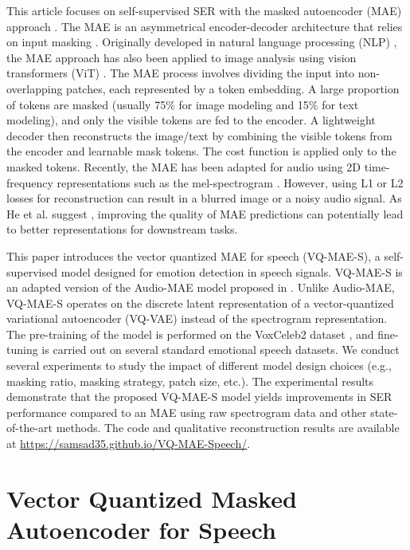 \documentclass{article}
\begin{document}
This article focuses on self-supervised SER with the masked autoencoder (MAE) approach \cite{he2022masked}. The MAE is an asymmetrical encoder-decoder architecture that relies on input masking \cite{he2022masked}. Originally developed in natural language processing (NLP) \cite{devlin2018bert}, the MAE approach has also been applied to image analysis using vision transformers (ViT) \cite{dosovitskiy2020image}. The MAE process involves dividing the input into non-overlapping patches, each represented by a token embedding. A large proportion of tokens are masked (usually 75\% for image modeling and 15\% for text modeling), and only the visible tokens are fed to the encoder. A lightweight decoder then reconstructs the image/text by combining the visible tokens from the encoder and learnable mask tokens. The cost function is applied only to the masked tokens. Recently, the MAE has been adapted for audio using 2D time-frequency representations such as the mel-spectrogram \cite{gong2022ssast, baade2022mae, xu2022masked}. However, using L1 or L2 losses for reconstruction can result in a blurred image or a noisy audio signal. As He et al. suggest \cite{he2022masked}, improving the quality of MAE predictions can potentially lead to better representations for downstream tasks. 

    This paper introduces the vector quantized MAE for speech (VQ-MAE-S), a self-supervised model designed for emotion detection in speech signals. VQ-MAE-S is an adapted version of the Audio-MAE model proposed in \cite{gong2022ssast, baade2022mae, xu2022masked}. Unlike Audio-MAE, VQ-MAE-S operates on the discrete latent representation of a vector-quantized variational autoencoder (VQ-VAE) \cite{van2017neural} instead of the spectrogram representation. The pre-training of the model is performed on the VoxCeleb2 dataset \cite{chung2018voxceleb2}, and fine-tuning is carried out on several standard emotional speech datasets. We conduct several experiments to study the impact of different model design choices (e.g., masking ratio, masking strategy, patch size, etc.). The experimental results demonstrate that the proposed VQ-MAE-S model yields improvements in SER performance compared to an MAE using raw spectrogram data and other state-of-the-art methods. The code and qualitative reconstruction results are available at \url{https://samsad35.github.io/VQ-MAE-Speech/}.

\section{Vector Quantized Masked Autoencoder for Speech}
\label{sec:methodology}
\end{document}
